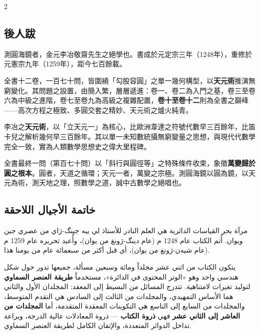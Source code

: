 \documentclass[11pt,a4paper]{article}
\newcommand{\ar}[1]{\arabicfont\beginR #1\endR}
\newcommand{\arnote}[1]{\textcolor{arabicblue}{\ar{#1}}}
\begin{document}
\vspace{0.5cm}

\begin{paracol}{2}

\begin{leftcolumn}
\subsection*{後人跋}

\begin{framed}
測圓海鏡者，金元李冶敬齋先生之絕學也。書成於元定宗三年（1248年），重修於元憲宗九年（1259年），距今七百餘載。

全書十二卷，一百七十問，皆圍繞「勾股容圓」之單一幾何構型，以\textbf{天元術}推演無窮變化。其問題之設置，由簡入繁，層層遞進：卷一、卷二為入門之基，卷三至卷六為中級之進階，卷七至卷九為高級之複雜配置，\textbf{卷十至卷十二}則為全書之巔峰——高次方程之極致、多圓交套之精妙、天元術之爐火純青。

李冶之\textbf{天元術}，以「立天元一」為核心，比歐洲韋達之符號代數早三百餘年，比笛卡兒之解析幾何早三百餘年。其以單一未知數統攝無窮變量之思想，與現代代數學完全一致，實為人類數學思想史之偉大里程碑。

全書最終一問（第百七十問）以「斜行與圓徑等」之特殊條件收束，象徵\textbf{萬變歸於圓之根本}。圓者，天道之循環；天元一者，萬變之宗極。測圓海鏡以圓為鏡，以天元為術，測天地之理，照數學之道，誠中古數學之絕唱也。
\end{framed}
\end{leftcolumn}

\begin{rightcolumn}
\subsection*{\ar{خاتمة الأجيال اللاحقة}}

\begin{framed}
\arnote{مرآة بحر القياسات الدائرية هي العلم النادر للأستاذ لي ييه جينگ-ژاي من عصري جين ويوان. أُتم الكتاب عام 1248 م (عام دينگ-ژونغ من يوان)، وأُعيد تحريره عام 1259 م (عام شيەن-ژونغ من يوان)، أي قبل أكثر من سبعمائة عام من يومنا هذا.}

\arnote{يتكون الكتاب من اثني عشر مجلداً ومائة وسبعين مسألة، جميعها تدور حول شكل هندسي واحد وهو «الوتر المحتوى في الدائرة»، مستخدماً \textbf{طريقة العنصر السماوي} لتوليد تغيرات لامتناهية. تتدرج المسائل من البسيط إلى المعقد: المجلدان الأول والثاني هما الأساس التمهيدي، والمجلدات من الثالث إلى السادس هي التقدم المتوسط، والمجلدات من السابع إلى التاسع هي التكوينات المعقدة المتقدمة، أما \textbf{المجلدات من العاشر إلى الثاني عشر} فهي \textbf{ذروة الكتاب} — ذروة المعادلات عالية الدرجة، وبراعة تداخل الدوائر المتعددة، والإتقان الكامل لطريقة العنصر السماوي.}


\end{framed}
\end{rightcolumn}
\end{paracol}
\end{document}
